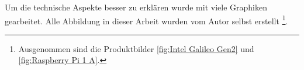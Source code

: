 \par
Um die technische Aspekte besser zu erklären wurde mit viele Graphiken gearbeitet. Alle Abbildung in dieser Arbeit wurden vom Autor selbst erstellt \footnote{Ausgenommen sind die Produktbilder \autoref{fig:Intel Galileo Gen2} und \ref{fig:Raspberry Pi 1 A}.}. 












\begin{comment}

In der heutigen Zeit ist die nachhaltige Produktion von Energie und ein schonender Umgang mit dieser Ressource ein wichtiges Anliegen der Öffentlichkeit. Speziell die IT-Branche ist von einem grossen Wachstum geprägt. Immer mehr Tätigkeiten werden automatisiert und bestehende Systeme ausgebaut. Dies verursacht einen immer grösseren Stromverbrauch im IT-Bereich. Ein Ziel der Energiepolitik 2050 ist die Senkung des immer weiter steigenden Energieverbrauchs.
\par
Um in der IT-Branche Energie zu sparen, können verschiedene Ansätze gewählt werden. Beispielsweise besteht die Möglichkeit bei Inaktivität automatisch in den Ruhemodus zu wechseln oder die Prozessoren durch sogenannte Sparmodi, insbesondere dynamische Taktfrequenzen oder das kurzzeitige Ein- und Ausschalten der Rechnereinheit, zu optimieren. Diese Sparansätze zielen jeweils nur auf den Hard- oder Softwarebereich ab. Sie berücksichtigen jedoch nicht die besondere Funktionsweise eines jeden Computers, wo die Software die Hardware, also ein Programm einen Prozessor, ansteuert. Anders im Rahmen dieser Arbeit, in welcher das Sparpotenzial bereichsübergreifend erforscht wird.



\section{Übersicht}


\end{comment}
